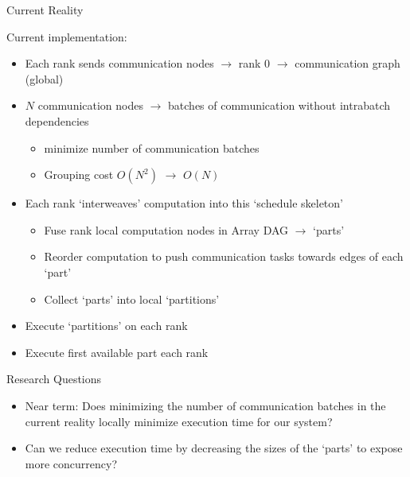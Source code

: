 \begin{frame}{Current Reality}
    
    \alert{Current implementation:} 
    \begin{itemize}
    \item Each \alert{rank} sends communication nodes $\to$ rank 0 $\to$ \alert{communication graph} (global)
    \item $N$ communication nodes $\to$ batches of communication without intrabatch dependencies
    \begin{itemize}
        \item \alert{minimize} number of communication batches
        \item \completed{} Grouping cost \(O(N^2)\) $\to$ \(O(N)\)
    \end{itemize}
    \item Each \alert{rank} `interweaves' computation into this `schedule skeleton'
    \begin{itemize}
    \item \alert{Fuse} rank local computation nodes in Array DAG $\to$ `parts'
    \item Reorder computation to push communication tasks towards edges of each `part'
    \item Collect `parts' into local `partitions'
    \end{itemize}

    \medskip
    \item Execute `partitions' on each rank
    \item Execute first available part each rank
    \end{itemize}
    
\end{frame}

\begin{frame}{Research Questions}

    \begin{itemize}
        \item \alert{Near term:} Does \alert{minimizing} the number of communication batches in the current reality locally minimize execution time for our system?
        \item Can we reduce execution time by decreasing the sizes of the `parts' to expose more concurrency?
    \end{itemize}
\end{frame}



